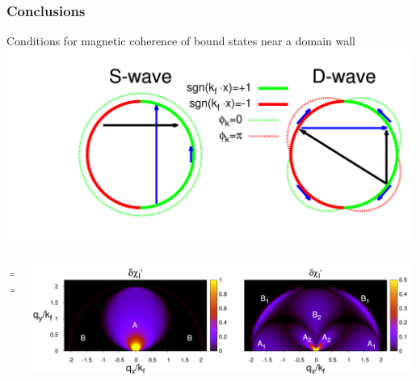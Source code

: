 \documentclass[amssymb,amsmath]{beamer}
\begin{document}
\begin{frame}\frametitle{Conclusions}
Conditions for magnetic coherence of bound states near a domain wall \\
\includegraphics[scale=0.1]{./figures_3/fig2_SD_andreev/Fig2_3.png}
\begin{columns}
\begin{column}{0.35\textwidth}
  $\Rightarrow$ \\
 \vspace{2cm}
 $\Rightarrow$
\end{column}
\begin{column}{0.7\textwidth}
\includegraphics[scale=0.08]{./figures_3/fig2_SD_andreev/Fig2_andreev_cut.png}\\

\end{column}
\end{columns}
\end{frame}
\end{document}
